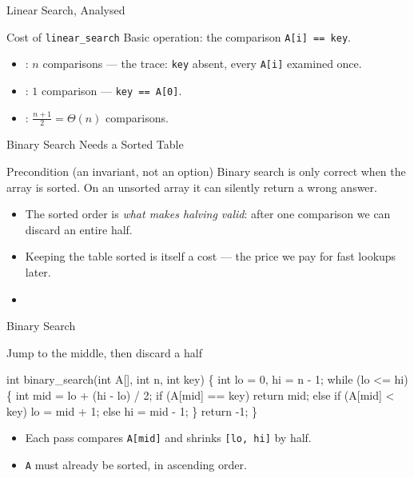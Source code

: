 \documentclass[aspectratio=169]{beamer}
\begin{document}
\begin{frame}{Linear Search, Analysed}
  \begin{block}{Cost of \texttt{linear\_search}}
    Basic operation: the comparison \texttt{A[i] == key}.
  \end{block}
  \begin{itemize}
    \item {}: $n$ comparisons --- the trace: \texttt{key} absent,
      every \texttt{A[i]} examined once.
    \item {}: $1$ comparison --- \texttt{key == A[0]}.
    \item {}: $\frac{n+1}{2} = \Theta(n)$ comparisons.
  \end{itemize}
  \vspace{0.15cm}
\end{frame}

\begin{frame}{Binary Search Needs a Sorted Table}
  \begin{block}{Precondition (an invariant, not an option)}
    Binary search is only correct when the array is sorted. On an unsorted
    array it can silently return a wrong answer.
  \end{block}
  \begin{itemize}
    \item The sorted order is \emph{what makes halving valid}: after one
      comparison we can discard an entire half.
    \item Keeping the table sorted is itself a cost --- the price we pay for
      fast lookups later.
    \item {}
  \end{itemize}
\end{frame}

\begin{frame}[fragile]{Binary Search}
  \begin{block}{Jump to the middle, then discard a half}
\begin{semiverbatim}
int binary_search(int A[], int n, int key) \{
    int lo = 0, hi = n - 1;
    while (lo <= hi) \{
        int mid = lo + (hi - lo) / 2;
        if (A[mid] == key) return mid;
        else if (A[mid] < key) lo = mid + 1;
        else                  hi = mid - 1;
    \}
    return -1;
\}
\end{semiverbatim}
  \end{block}
  \begin{itemize}
    \item Each pass compares \texttt{A[mid]} and shrinks \texttt{[lo, hi]} by half.
    \item \texttt{A} must already be sorted, in ascending order.
  \end{itemize}
\end{frame}
\end{document}
